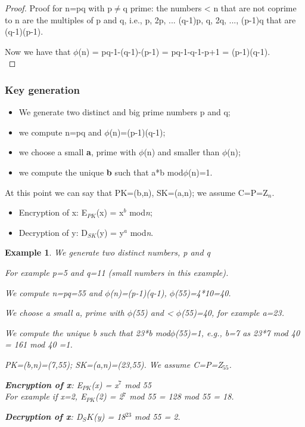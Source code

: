\documentclass[a4paper, 12pt]{report}
\newtheorem{example}{\textbf{Example}}
\begin{document}
\begin{proof}
	Proof for n=pq with p$\ne$q prime: the numbers < n that are not coprime to n are the multiples of p and q, i.e., p, 2p, ... (q-1)p, q, 2q, ..., (p-1)q that are (q-1)(p-1).
	
	Now we have that $\phi$(n) = pq-1-(q-1)-(p-1) = pq-1-q-1-p+1 = (p-1)(q-1).\\   
\end{proof}

\subsubsection{Key generation}
\begin{itemize}
	\item We generate two distinct and big prime numbers p and q;
	\item we compute n=pq and $\phi$(n)=(p-1)(q-1);
	\item we choose a small \textbf{a}, prime with $\phi$(n) and smaller than $\phi$(n);
	\item we compute the unique \textbf{b} such that a*b mod$\phi$(n)=1.
\end{itemize}

At this point we can say that PK=(b,n), SK=(a,n); we assume C=P=Z$_n$. 
\begin{itemize}
	\item Encryption of x: E$_{PK}$(x) = x$^b$ mod\textit{n};
	\item Decryption of y: D$_{SK}$(y) = y$^a$ mod\textit{n}.
\end{itemize}

\begin{example}
	We generate two distinct numbers, p and q
	
	For example p=5 and q=11 (small numbers in this example).
	
	We compute n=pq=55 and $\phi$(n)=(p-1)(q-1), $\phi$(55)=4*10=40.
	
	We choose a small a, prime with $\phi$(55) and < $\phi$(55)=40, for example a=23.
	
	We compute the unique b such that 23*b mod$\phi$(55)=1, e.g., b=7 as 23*7 mod 40 = 161 mod 40 =1.
	
	PK=(b,n)=(7,55); SK=(a,n)=(23,55). We assume C=P=Z$_{55}$.
	
	\textbf{Encryption of x}: E$_{PK}$(x) = x$^7$ mod 55\\
	For example if x=2, E$_{PK}$(2) = 2$^7$ mod 55 = 128 mod 55 = 18.
	
	\textbf{Decryption of x}: D$_SK$(y) = 18$^23$ mod 55 = 2.
\end{example}
\end{document}
